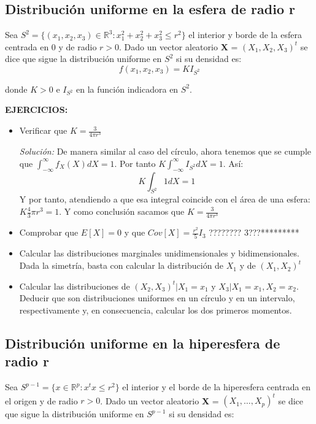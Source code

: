 \documentclass{article}
\theoremstyle{theorem-style}  %
\theoremstyle{definition}
\theoremstyle{example-style}
\begin{document}
	
	\subsection{Distribución uniforme en la esfera de radio r}
	
	Sea $S^2=\{(x_1, x_2, x_3) \in  \mathbb{R}^3: x_1^2 + x_2^2+x_3^2\leq r^2\}$ el interior y borde de la esfera centrada en 0 y de radio $r>0$. Dado un vector aleatorio \textbf{X} = $(X_1, X_2, X_3)^t$ se dice que sigue la distribución uniforme en $S^2$ si su densidad es:
	$$ f(x_1, x_2, x_3)= KI_{S^2}$$
	
	donde $K>0$ e $I_{S^2}$ en la función indicadora en $S^2$. 
	
	\textbf{EJERCICIOS:}
	\begin{itemize}
		\item Verificar que $K=\frac{3}{4\pi r^3}$
		
		\textit{Solución:} De manera similar al caso del círculo, ahora tenemos que se cumple que $\int_{-\infty}^{\infty} f_X(X) dX = 1$. Por tanto $K \int_{-\infty}^{\infty} I_{S^2} dX =1 $. Así: $$K \int_{S^2}^{}1dX = 1 $$ Y por tanto, atendiendo a que esa integral coincide con el área de una esfera: $K\frac{4}{3}\pi r^3 = 1$. Y como conclusión sacamos que $K=\frac{3}{4\pi r^3}$
		
		\item   Comprobar que $E[X]=0$ y que $Cov[X] = \frac{r^2}{5}I_3$ ???????? 3???*********
		
		\item Calcular las distribuciones marginales unidimensionales y bidimensionales. Dada la simetría, basta con calcular la distribución de $X_1$ y de $(X_1, X_2)^t$
		
		\item Calcular las distribuciones de $(X_2, X_3)^t|X_1=x_1$ y $X_3|X_1=x_1, X_2=x_2$. Deducir que son distribuciones uniformes en un círculo y en un intervalo, respectivamente y, en consecuencia, calcular los dos primeros momentos.
		
	\end{itemize}
	
	\subsection{Distribución uniforme en la hiperesfera de radio r}
	
	Sea $S^{p-1} = \{x \in \mathbb{R}^p: x^tx\leq r^2\}$ el interior y el borde de la hiperesfera centrada en el origen y de radio $r>0$. Dado un vector aleatorio \textbf{X} = $(X_1, \dots , X_p)^t$ se dice que sigue la distribución uniforme en $S^{p-1}$ si su densidad es:
	
\end{document}
